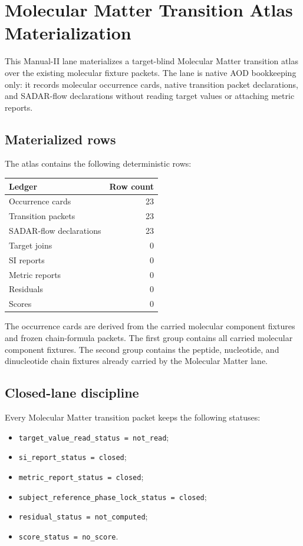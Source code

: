 \section{Molecular Matter Transition Atlas Materialization}

This Manual-II lane materializes a target-blind Molecular Matter transition atlas over the existing molecular fixture packets. The lane is native AOD bookkeeping only: it records molecular occurrence cards, native transition packet declarations, and SADAR-flow declarations without reading target values or attaching metric reports.

\subsection{Materialized rows}

The atlas contains the following deterministic rows:
\begin{center}
\begin{tabular}{lr}
\toprule
Ledger & Row count \\
\midrule
Occurrence cards & 23 \\
Transition packets & 23 \\
SADAR-flow declarations & 23 \\
Target joins & 0 \\
SI reports & 0 \\
Metric reports & 0 \\
Residuals & 0 \\
Scores & 0 \\
\bottomrule
\end{tabular}
\end{center}

The occurrence cards are derived from the carried molecular component fixtures and frozen chain-formula packets. The first group contains all carried molecular component fixtures. The second group contains the peptide, nucleotide, and dinucleotide chain fixtures already carried by the Molecular Matter lane.

\subsection{Closed-lane discipline}

Every Molecular Matter transition packet keeps the following statuses:
\begin{itemize}[leftmargin=1.4em]
\item \texttt{target\_value\_read\_status = not\_read};
\item \texttt{si\_report\_status = closed};
\item \texttt{metric\_report\_status = closed};
\item \texttt{subject\_reference\_phase\_lock\_status = closed};
\item \texttt{residual\_status = not\_computed};
\item \texttt{score\_status = no\_score}.
\end{itemize}

